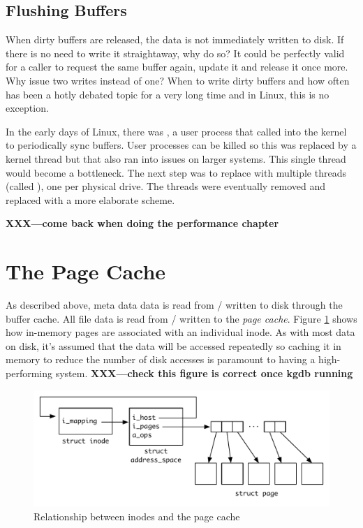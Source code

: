 \subsection{Flushing Buffers}

When dirty buffers are released, the data is not immediately written to disk. If there is no need to write it straightaway, why do so? It could be perfectly valid for a caller to request the same buffer again, update it and release it once more. Why issue two writes instead of one? When to write dirty buffers and how often has been a hotly debated topic for a very long time and in Linux, this is no exception.

In the early days of Linux, there was , a user process that called into the kernel to periodically sync buffers. User processes can be killed so this was replaced by a kernel thread but that also ran into issues on larger systems. This single thread would become a bottleneck. The next step was to replace  with multiple threads (called ), one per physical drive. The  threads were eventually removed and replaced with a more elaborate scheme.

\textbf{XXX---come back when doing the performance chapter}


\section{The Page Cache}\label{page-cache}



As described above, meta data data is read from / written to disk through the buffer cache. All file data is read from / written to the \textit{page cache}. Figure \ref{fig:address-space} shows how in-memory pages are associated with an individual inode. As with most data on disk, it's assumed that the data will be accessed repeatedly so caching it in memory to reduce the number of disk accesses is paramount to having a high-performing system. \textbf{XXX---check this figure is correct once kgdb running}

\begin{figure}[h]
	\includegraphics[scale=0.6]{figures/address-space.pdf}
	\centering
	\caption{Relationship between inodes and the page cache}
	\label{fig:address-space}
\end{figure}

